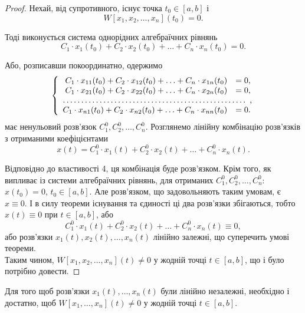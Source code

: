 \begin{proof}
	Нехай, від супротивного, існує точка $t_0 \in [a, b]$ і \[W[x_1, x_2, \ldots, x_n](t_0) = 0.\]

	Тоді виконується система однорідних алгебраїчних рівнянь \[C_1 \cdot x_1(t_0) + C_2 \cdot x_2(t_0) + \ldots + C_n \cdot x_n(t_0) = 0. \]

	Або, розписавши покоординатно, одержимо
	\begin{equation*}
		\left\{
			\begin{array}{rl}
				C_1 \cdot x_{11}(t_0) + C_2 \cdot x_{12}(t_0) + \ldots + C_n \cdot x_{1n}(t_0) &= 0, \\
				C_1 \cdot x_{21}(t_0) + C_2 \cdot x_{22}(t_0) + \ldots + C_n \cdot x_{2n}(t_0) &= 0, \\
				\hdotsfor{2}, \\
				C_1 \cdot x_{n1}(t_0) + C_2 \cdot x_{n2}(t_0) + \ldots + C_n \cdot x_{nn}(t_0) &= 0.
			\end{array}
		\right.
	\end{equation*}
 	має ненульовий розв'язок $C_1^0, C_2^0, \ldots, C_n^0$. Розглянемо лінійну комбінацію розв'язків з отриманими коефіцієнтами
 	\begin{equation*}
 		x(t) = C_1^0 \cdot x_1(t) + C_2^0 \cdot x_2(t) + \ldots + C_n^0 \cdot x_n(t).
 	\end{equation*}

	Відповідно до властивості 4, ця комбінація буде розв'язком. Крім того, як випливає із системи алгебраїчних рівнянь, для отриманих $C_1^0, C_2^0, \ldots, C_n^0$: $x(t_0) = 0$, $t_0 \in [a, b]$. Але розв'язком, що задовольняють таким умовам, є $x \equiv 0$. І в силу теореми існування та єдиності ці два розв'язки збігаються, тобто $x(t) \equiv 0$ при $t \in [a, b]$, або 
 	\begin{equation*}
 		C_1^0 \cdot x_1(t) + C_2^0 \cdot x_2(t) + \ldots + C_n^0 \cdot x_n(t) \equiv 0,
 	\end{equation*}
	або розв'язки $x_1(t), x_2(t), \ldots, x_n(t)$ лінійно залежні, що суперечить умові теореми.  \\

	Таким чином, $W[x_1, x_2, \ldots, x_n](t) \ne 0$ у жодній точці $t \in [a, b]$, що і було потрібно довести.
\end{proof}

\begin{theorem}
	Для того щоб розв'язки $x_1(t), \ldots, x_n(t)$ були лінійно незалежні, необхідно і достатно, щоб $W[x_1, \ldots, x_n](t) \ne 0$ у жодній точці $t \in [a, b]$.
\end{theorem}

